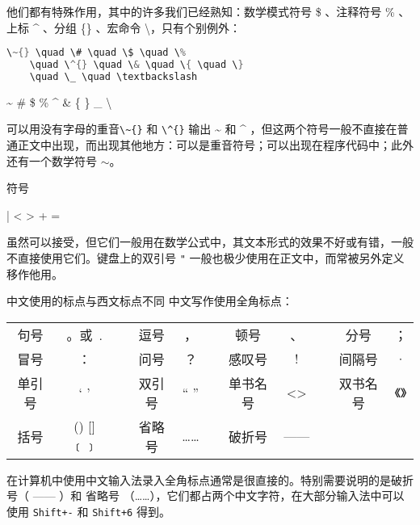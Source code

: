 他们都有特殊作用，其中的许多我们已经熟知：数学模式符号 \$ 、注释符号 \% 、上标 \^{} 、分组 \{\} 、宏命令 \textbackslash，只有个别例外：

\begin{minipage}[t]{0.45\textwidth}
    \begin{lstlisting}[language = java]
    \~{} \quad \# \quad \$ \quad \% 
    \quad \^{} \quad \& \quad \{ \quad \} 
    \quad \_ \quad \textbackslash 
    \end{lstlisting}
\end{minipage}
\hfill
\begin{minipage}[t]{0.45\textwidth}
    \vspace{0.1cm}
    \hspace{0.5cm}

    \~{} \quad \# \quad \$ \quad \% \quad \^{} \quad \& \quad \{ \quad \} \quad \_ \quad \textbackslash 
\end{minipage}

可以用没有字母的重音\verb|\~{}| 和 \verb|\^{}| 输出 \~{} 和 \^{} ，但这两个符号一般不直接在普通正文中出现，而出现其他地方：可以是重音符号；可以出现在程序代码中；此外还有一个数学符号 $\sim$。

符号

| \quad < \quad > \quad + \quad =

虽然可以接受，但它们一般用在数学公式中，其文本形式的效果不好或有错，一般不直接使用它们。键盘上的双引号 \verb|"| 一般也极少使用在正文中，而常被另外定义移作他用。

中文使用的标点与西文标点不同 中文写作使用全角标点：

\begin{table}[H]
    \centering
    \begin{tabular}{ccccccccccc}
        句号 & 。或\ . & &
        逗号 & ， & &
        顿号 & 、& &
        分号 & ； \\
        冒号 & ： &&
        问号 & ？ &&
        感叹号 & ! &&
        间隔号 & · \\ 
        单引号 & ‘ \quad ’ &&
        双引号 & “ \quad ” &&
        单书名号 & <\quad  > &&
        双书名号 & 《\quad 》 \\
        括号 & () [] ﹝﹞ &&
        省略号 & …… && 
        破折号 & —— 
    \end{tabular}
\end{table}

在计算机中使用中文输入法录入全角标点通常是很直接的。特别需要说明的是破折号（ —— ）和 省略号 （……），它们都占两个中文字符，在大部分输入法中可以使用 \verb|Shift+-| 和 \verb|Shift+6| 得到。

